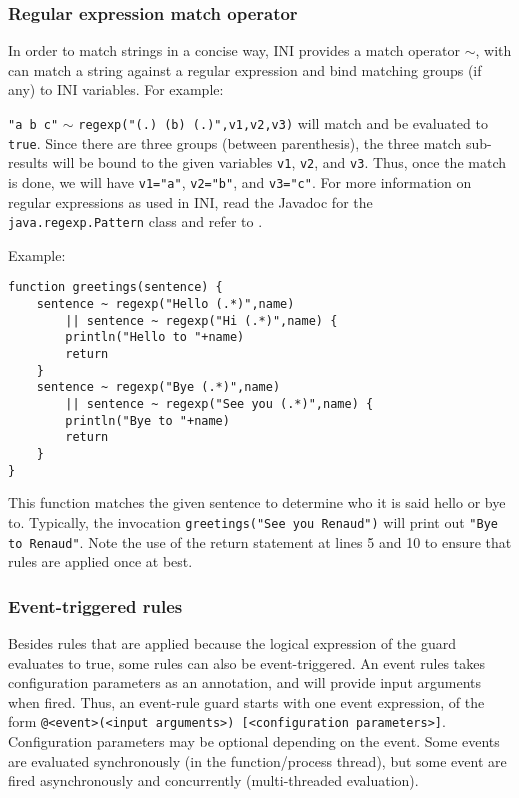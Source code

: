 \documentclass[11pt]{article}
\begin{document}
\subsubsection{Regular expression match operator\label{subsubsec:regexp}}

In order to match strings in a concise way, INI provides a match operator $\sim$, with can match a string against a regular expression \cite{friedl2006} and bind matching groups (if any) to INI variables. For example:

\texttt{"a b c"} $\sim$ \texttt{regexp("(.) (b) (.)",v1,v2,v3)} will match and be evaluated to \texttt{true}. Since there are three groups (between parenthesis), the three match sub-results will be bound to the given variables \texttt{v1}, \texttt{v2}, and \texttt{v3}. Thus, once the match is done, we will have \texttt{v1="a"}, \texttt{v2="b"}, and \texttt{v3="c"}. For more information on regular expressions as used in INI, read the Javadoc for the \texttt{java.regexp.Pattern} class and refer to \cite{friedl2006}.

Example:

\begin{lstlisting}
function greetings(sentence) {
	sentence ~ regexp("Hello (.*)",name)
		|| sentence ~ regexp("Hi (.*)",name) {
		println("Hello to "+name)
		return
	}
	sentence ~ regexp("Bye (.*)",name)
		|| sentence ~ regexp("See you (.*)",name) {
		println("Bye to "+name)
		return
	}
}
\end{lstlisting}

This function matches the given sentence to determine who it is said hello or bye to. Typically, the invocation \texttt{greetings("See you Renaud")} will print out \texttt{"Bye to Renaud"}. Note the use of the return statement at lines 5 and 10 to ensure that rules are applied once at best.

\subsubsection{Event-triggered rules}

Besides rules that are applied because the logical expression of the guard evaluates to true, some rules can also be event-triggered. An event rules takes configuration parameters as an annotation, and will provide input arguments when fired. Thus, an event-rule guard starts with one event expression, of the form \texttt{@<event>(<input arguments>) [<configuration parameters>]}. Configuration parameters may be optional depending on the event. Some events are evaluated synchronously (in the function/process thread), but some event are fired asynchronously and concurrently (multi-threaded evaluation).
\end{document}
